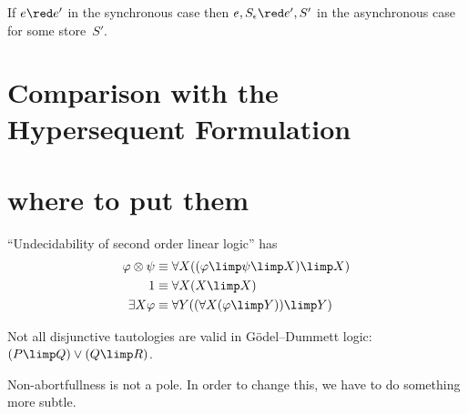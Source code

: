 \begin{proposition}
 If $e\red e'$ in the synchronous case then $e, S_\epsilon \red e', S'$
 in the asynchronous case for some store~$S'$.
\end{proposition}


\section{Comparison with the Hypersequent Formulation}


\section*{where to put them}

``Undecidability of second order linear logic'' has
\begin{align*}
 \phi\otimes \psi&\equiv \forall X((\phi\limp\psi\limp X)\limp X) \\
 {1}      &\equiv \forall X(X\limp X)\\
 \exists X\phi   &\equiv \forall Y((\forall X(\phi\limp Y))\limp Y)
\end{align*}

Not all disjunctive tautologies are valid in G\"odel--Dummett logic:
$(P\limp Q)\lor(Q\limp R)$.

Non-abortfullness is not a pole.
In order to change this, we have to do something more subtle.
